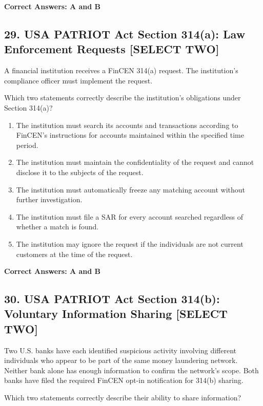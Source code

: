 \documentclass[11pt,a4paper]{article}
\begin{document}
	\textbf{Correct Answers: A and B}
	
	\subsection{29. USA PATRIOT Act Section 314(a): Law Enforcement Requests \textnormal{[SELECT TWO]}}
	
	A financial institution receives a FinCEN 314(a) request. The institution's compliance officer must implement the request.
	
	Which two statements correctly describe the institution's obligations under Section 314(a)?
	
	\begin{enumerate}[label=\Alph*.]
		\item The institution must search its accounts and transactions according to FinCEN's instructions for accounts maintained within the specified time period.
		\item The institution must maintain the confidentiality of the request and cannot disclose it to the subjects of the request.
		\item The institution must automatically freeze any matching account without further investigation.
		\item The institution must file a SAR for every account searched regardless of whether a match is found.
		\item The institution may ignore the request if the individuals are not current customers at the time of the request.
	\end{enumerate}
	
	\textbf{Correct Answers: A and B}
	
	\subsection{30. USA PATRIOT Act Section 314(b): Voluntary Information Sharing \textnormal{[SELECT TWO]}}
	
	Two U.S. banks have each identified suspicious activity involving different individuals who appear to be part of the same money laundering network. Neither bank alone has enough information to confirm the network's scope. Both banks have filed the required FinCEN opt-in notification for 314(b) sharing.
	
	Which two statements correctly describe their ability to share information?
	
\end{document}
